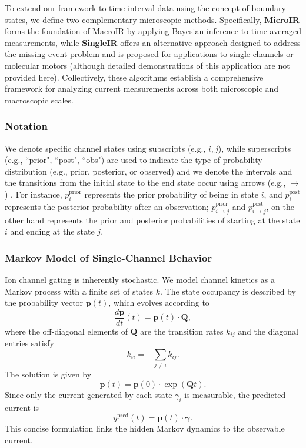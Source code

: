 \documentclass[pdflatex,sn-nature]{sn-jnl}%
\begin{document}
To extend our framework to time-interval data using the concept of boundary states, we define two complementary microscopic methods. Specifically, \textbf{MicroIR} forms the foundation of MacroIR by applying Bayesian inference to time-averaged measurements, while \textbf{SingleIR} offers an alternative approach designed to address the missing event problem and is proposed for applications to single channels or molecular motors (although detailed demonstrations of this application are not provided here). Collectively, these algorithms establish a comprehensive framework for analyzing current measurements across both microscopic and macroscopic scales.
\subsubsection{Notation}
We denote specific channel states using subscripts (e.g., \( i, j \)), while superscripts (e.g., ``prior", ``post", ``obs") are used to indicate the type of probability distribution (e.g., prior, posterior, or observed) and we denote the intervals and the transitions from the initial state to the end state occur using arrows (e.g., $\rightarrow$) . For instance, \( p_i^{\text{prior}} \) represents the prior probability of being in state \( i \), and \( p_i^{\text{post}} \) represents the posterior probability after an observation; $p_{i \rightarrow j}^{\text{prior}}$ and $p_{i \rightarrow j}^{\text{post}}$, on the other hand represents the prior  and posterior probabilities of starting at the state $i$ and ending at the state $j$. 

\subsubsection{Markov Model of Single-Channel Behavior}\label{SingleChannel Behavior}

Ion channel gating is inherently stochastic. We model channel kinetics as a Markov process with a finite set of states \(k\). The state occupancy is described by the probability vector \(\boldsymbol{p}(t)\), which evolves according to
\begin{equation}
	\frac{d\boldsymbol{p}}{dt}(t) = \boldsymbol{p}(t)\cdot \boldsymbol{Q},
	\label{eq:master_equation_short}
\end{equation}
where the off-diagonal elements of \(\boldsymbol{Q}\) are the transition rates \(k_{ij}\) and the diagonal entries satisfy
\begin{equation}
	k_{ii} = -\sum_{j\neq i} k_{ij}.
	\label{eq:Q_diag_short}
\end{equation}
The solution is given by
\begin{equation}
	\boldsymbol{p}(t) = \boldsymbol{p}(0) \cdot \exp(\boldsymbol{Q}t).
	\label{eq:master equation solution}
\end{equation}
Since only the current generated by each state \(\gamma_i\) is measurable, the predicted current is
\begin{equation}
	y^{\text{pred}}(t) = \boldsymbol{p}(t)\cdot \boldsymbol{\gamma}.
	\label{eq:current_pred_short}
\end{equation}
This concise formulation links the hidden Markov dynamics to the observable current.
\end{document}
